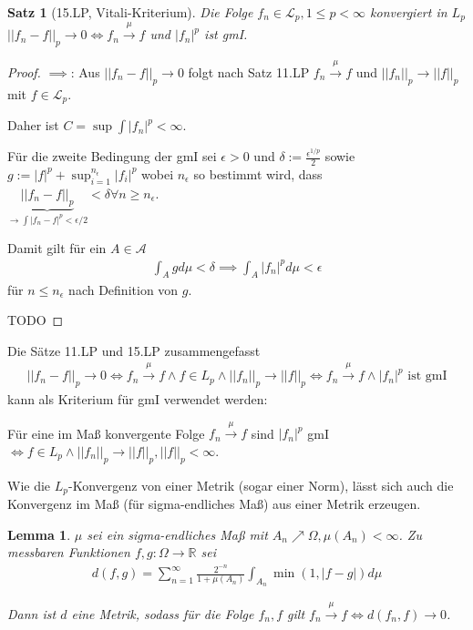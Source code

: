 \documentclass[]{article}
\newtheorem{theorem}{Satz}
\newtheorem{lemma}{Lemma}
\begin{document}
\begin{theorem}[15.LP, Vitali-Kriterium]
	Die Folge $f_n \in \mathcal{L}_p, 1 \leq p < \infty$ konvergiert in $L_p$ $||f_n - f||_p \rightarrow 0 \iff f_n \xrightarrow{\mu} f$ und $|f_n|^p$ ist gmI.
\end{theorem}

\begin{proof}
	$\implies$: Aus $||f_n - f||_p \rightarrow 0$ folgt nach Satz 11.LP $f_n \xrightarrow{\mu}f$ und $||f_n||_p \rightarrow ||f||_p$ mit $f \in \mathcal{L}_p$.
	
	Daher ist $C = \sup \int |f_n|^p < \infty$.
	
	Für die zweite Bedingung der gmI sei $\epsilon > 0$ und $\delta := \frac{\epsilon^{1/p}}{2}$ sowie $g:= |f|^p + \sup_{i=1}^{n_\epsilon} |f_i|^p$ wobei $n_\epsilon$ so bestimmt wird, dass $\underbrace{||f_n - f||_p}_{\rightarrow\int |f_n - f|^p < \epsilon/2} < \delta \forall n \geq n_\epsilon$.
	
	Damit gilt für ein $A \in \mathcal{A}$
	\begin{align*}
		\int_A g d\mu < \delta \implies \int_A |f_n|^p d\mu < \epsilon
	\end{align*}
	für $n \leq n_\epsilon$ nach Definition von $g$.
	
	TODO
\end{proof}

Die Sätze 11.LP und 15.LP zusammengefasst
\begin{align*}
	||f_n - f||_p \rightarrow 0 \iff f_n \xrightarrow{\mu} f \land f\in L_p \land ||f_n||_p \rightarrow ||f||_p \iff f_n \xrightarrow{\mu} f \land |f_n|^p \text{ ist gmI}
\end{align*}
kann als Kriterium für gmI verwendet werden:

Für eine im Maß konvergente Folge $f_n \xrightarrow{\mu}f$ sind $|f_n|^p$ gmI $\iff f \in L_p \land ||f_n||_p \rightarrow ||f||_p, ||f||_p < \infty$.

Wie die $L_p$-Konvergenz von einer Metrik (sogar einer Norm), lässt sich auch die Konvergenz im Maß (für sigma-endliches Maß) aus einer Metrik erzeugen.

\begin{lemma}
	$\mu$ sei ein sigma-endliches Maß mit $A_n \nearrow \Omega, \mu(A_n) < \infty$. Zu messbaren Funktionen $f,g : \Omega \rightarrow \mathbb{R}$ sei
	\begin{align*}
		d(f,g) = \sum_{n=1}^{\infty} \frac{2^{-n}}{1+\mu(A_n)} \int_{A_n} \min (1, |f-g|) d\mu
	\end{align*}

	Dann ist $d$ eine Metrik, sodass für die Folge $f_n, f$ gilt $f_n \xrightarrow{\mu} f \iff d(f_n, f) \rightarrow 0$.
\end{lemma}
\end{document}
